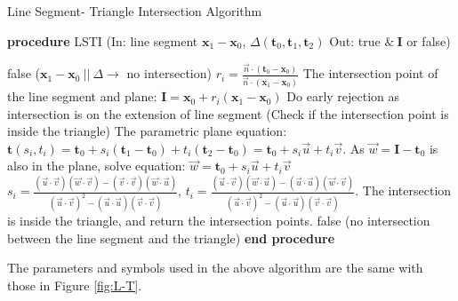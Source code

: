\documentclass[a4paper,11pt]{article}
\begin{document}
\begin{algorithm}[H]
   \caption{Line Segment- Triangle Intersection Algorithm} \label{alg:mg_algo}
   \begin{algorithmic}[1]
     \STATE \textbf{procedure} LSTI (In: line segment $\mathbf{x}_1-\mathbf{x}_0$, $\Delta(\mathbf{t}_0, \mathbf{t}_1, \mathbf{t}_2)$ Out: true $ \&\ \mathbf{I}$ or false)

     \RETURN false ($\mathbf{x}_1-\mathbf{x}_0~||~\Delta \rightarrow$ no intersection)
     \ELSE
     \STATE $ r_i=\frac{\vec{n} \cdot (\mathbf{t}_0-\mathbf{x}_0)}{ \vec{n}\cdot(\mathbf{x}_1-\mathbf{x}_0)} $
     \STATE The intersection point of the line segment and plane: $ \mathbf{I}=\mathbf{x}_0+r_i(\mathbf{x}_1-\mathbf{x}_0) $ 
     \STATE Do early rejection as intersection is on the extension of line segment 
     \ELSE 
     \STATE (Check if the intersection point is inside the triangle)
     \STATE The parametric plane equation: $ \mathbf{t}(s_i,t_i)=\mathbf{t}_0+s_i (\mathbf{t}_1-\mathbf{t}_0)+t_i(\mathbf{t}_2-\mathbf{t}_0)=\mathbf{t}_0+s_i\vec{u}+t_i\vec{v} $. As $\vec{w}=\mathbf{I}-\mathbf{t}_0$ is also in the plane, solve equation: $\vec{w}=\mathbf{t}_0+s_i\vec{u}+t_i\vec{v}$ 
     \STATE $ s_i=\frac{(\vec{u} \cdot \vec{v})(\vec{w} \cdot \vec{v})-(\vec{v} \cdot \vec{v})(\vec{w} \cdot \vec{u})}{(\vec{u} \cdot \vec{v})^2-(\vec{u} \cdot \vec{u})(\vec{v} \cdot \vec{v})} $,  $ t_i=\frac{(\vec{u} \cdot \vec{v})(\vec{w} \cdot \vec{u})-(\vec{u} \cdot \vec{u})(\vec{w} \cdot \vec{v})}{(\vec{u} \cdot \vec{v})^2-(\vec{u} \cdot \vec{u})(\vec{v} \cdot \vec{v})} $.
     \STATE The intersection is inside the triangle, and return the intersection points.
     \ELSE
     \RETURN false (no intersection between the line segment and the triangle)
     \ENDIF
     \ENDIF
\ENDIF
       \STATE \textbf{end procedure}
   \end{algorithmic}
 \end{algorithm}
The parameters and symbols used in the above algorithm are the same with those in Figure \ref{fig:L-T}. 
\end{document}
